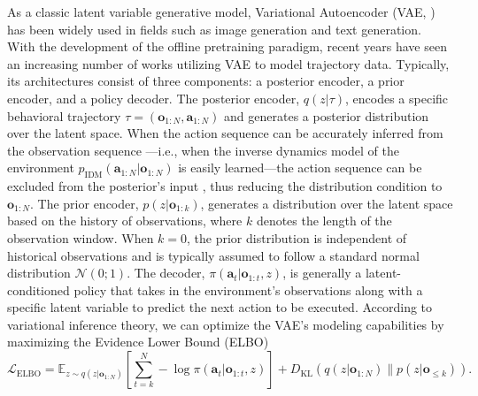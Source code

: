 As a classic latent variable generative model, Variational Autoencoder (VAE, \cite{vae}) has been widely used in fields such as image generation and text generation. With the development of the offline pretraining paradigm, recent years have seen an increasing number of works utilizing VAE to model trajectory data. Typically, its architectures consist of three components: a posterior encoder, a prior encoder, and a policy decoder. The posterior encoder, $q(z | \tau)$, encodes a specific behavioral trajectory $\tau = (\mathbf{o}_{1:N}, \mathbf{a}_{1:N})$ and generates a posterior distribution over the latent space. When the action sequence can be accurately inferred from the observation sequence \citep{vpt, eccvpt}—i.e., when the inverse dynamics model of the environment $p_{\text{IDM}}(\mathbf{a}_{1:N} | \mathbf{o}_{1:N})$ is easily learned—the action sequence can be excluded from the posterior's input \citep{groot1}, thus reducing the distribution condition to $\mathbf{o}_{1:N}$. The prior encoder, $p(z | \mathbf{o}_{1:k})$, generates a distribution over the latent space based on the history of observations, where $k$ denotes the length of the observation window. When $k = 0$, the prior distribution is independent of historical observations and is typically assumed to follow a standard normal distribution $\mathcal{N}(0; 1)$. The decoder, $\pi (\mathbf{a}_t | \mathbf{o}_{1:t}, z)$, is generally a latent-conditioned policy that takes in the environment’s observations along with a specific latent variable to predict the next action to be executed. According to variational inference theory, we can optimize the VAE’s modeling capabilities by maximizing the Evidence Lower Bound (ELBO)
\begin{equation}
    \mathcal{L}_{\text{ELBO}} = \mathbb{E}_{z \sim q(z | \mathbf{o}_{1:N})} \left[ \sum_{t=k}^{N} - \log \pi(\mathbf{a}_t | \mathbf{o}_{1:t}, z) \right] + D_{\text{KL}} ( q(z | \mathbf{o}_{1:N}) \parallel p(z | \mathbf{o}_{\le k})). 
\end{equation}


